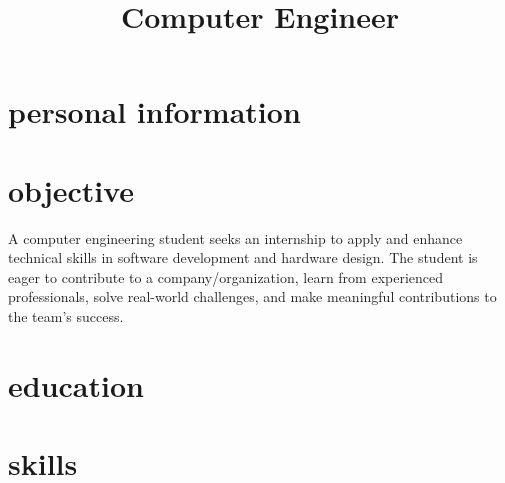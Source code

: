 \documentclass{moderncv}
\title{Computer Engineer}
\begin{document}
\makecvtitle
	\section{personal information}

	\section{objective}
A computer engineering student seeks an internship to apply and enhance technical skills in software development and hardware design. The student is eager to contribute to a company/organization, learn from experienced professionals, solve real-world challenges, and make meaningful contributions to the team's success.
	\section{education}
	\section{skills}
	 
\end{document}
